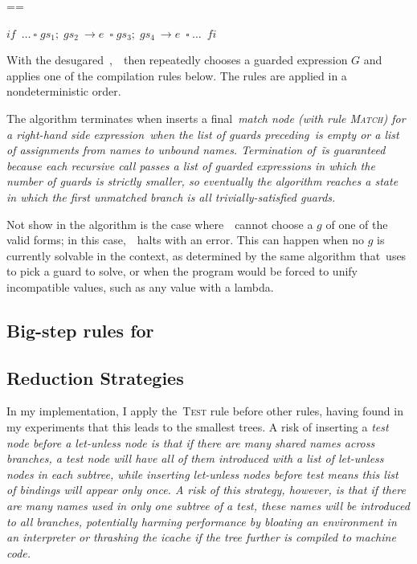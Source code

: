 \documentclass[manuscript,screen, 12pt, nonacm]{acmart}
\begin{document}
    ==
    
    ${if\;~\dots~\square\; gs_{1};\; gs_{2}~\rightarrow e~\;\square\; gs_{3};\; gs_{4}~\rightarrow e~\;\square~\dots~\;fi}$

    With the desugared~\iffibf,~\Compile\ then repeatedly chooses a guarded
    expression $G$ and applies one of the compilation rules below. The rules are
    applied in a nondeterministic order. 

    The algorithm terminates when inserts a final~\it{match} node (with rule
    \textsc{Match}) for a right-hand side expression~\expr when the list of
    guards preceding~\expr is empty or a list of assignments from names to
    unbound names. Termination of~\DTran\~is guaranteed because each recursive
    call passes a list of guarded expressions in which the number of guards is
    strictly smaller, so eventually the algorithm reaches a state in which the
    first unmatched branch is all trivially-satisfied guards.


    Not show in the algorithm is the case where~\Compile\ cannot choose a $g$ of
    one of the valid forms; in this case,~\Compile\ halts with an error. This
    can happen when no $g$ is currently solvable in the context, as determined
    by the same algorithm that~\VMinus uses to pick a guard to solve, or when
    the program would be forced to unify incompatible values, such as any value
    with a lambda. 

      \subsection{Big-step rules for \Compile}
        \compiler

      \subsection{Reduction Strategies}

      In my implementation, I apply the~\textsc{Test} rule before other rules,
      having found in my experiments that this leads to the smallest trees. A
      risk of inserting a \it{test} node before a \it{let-unless} node is that
      if there are many shared names across branches, a \it{test} node will have
      all of them introduced with a list of \it{let-unless} nodes in each
      subtree, while inserting \it{let-unless} nodes before \it{test} means this
      list of bindings will appear only once. A risk of this strategy, however,
      is that if there are many names used in only one subtree of a \it{test},
      these names will be introduced to \it{all} branches, potentially harming
      performance by bloating an environment in an interpreter or thrashing the
      icache if the tree further is compiled to machine code. 
\end{document}
